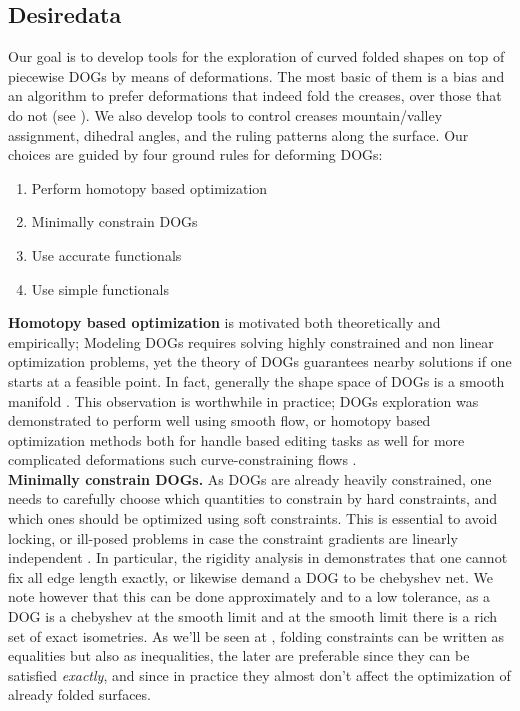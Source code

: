 \subsection{Desiredata}
Our goal is to develop tools for the exploration of curved folded shapes on top of piecewise DOGs by means of deformations. The most basic of them is a bias and an algorithm to prefer deformations that indeed fold the creases, over those that do not (see ). We also develop tools to control creases mountain/valley assignment, dihedral angles, and the ruling patterns along the surface. Our choices are guided by four ground rules for deforming DOGs:
\begin{enumerate}
  \item Perform homotopy based optimization \label{homotopy_opt}
  \item Minimally constrain DOGs \label{minimal_const}
  \item Use accurate functionals \label{accurate_func}
  \item Use simple functionals
\end{enumerate}
\textbf{Homotopy based optimization} is motivated both theoretically and empirically; Modeling DOGs requires solving highly constrained and non linear optimization problems, yet the theory of DOGs guarantees nearby solutions if one starts at a feasible point. In fact, generally the shape space of DOGs is a smooth manifold \cite{rabi2018shape}. This observation is worthwhile in practice; DOGs exploration was demonstrated to perform well using smooth flow, or homotopy based optimization methods both for handle based editing tasks as well for more complicated deformations such curve-constraining flows \cite{rabi2018shape}. \\
\textbf{Minimally constrain DOGs.} As DOGs are already heavily constrained, one needs to carefully choose which quantities to constrain by hard constraints, and which ones should be optimized using soft constraints. This is essential to avoid locking, or ill-posed problems in case the constraint gradients are linearly independent \cite{rabi2018shape}. In particular, the rigidity analysis in \cite{rabi18} demonstrates that one cannot fix all edge length exactly, or likewise demand a DOG to be chebyshev net. We note however that this can be done approximately and to a low tolerance, as a DOG is a chebyshev at the smooth limit and at the smooth limit there is a rich set of exact isometries. As we'll be seen at , folding constraints can be written as equalities but also as inequalities, the later are preferable since they can be satisfied \textit{exactly}, and since in practice they almost don't affect the optimization of already folded surfaces.\\
